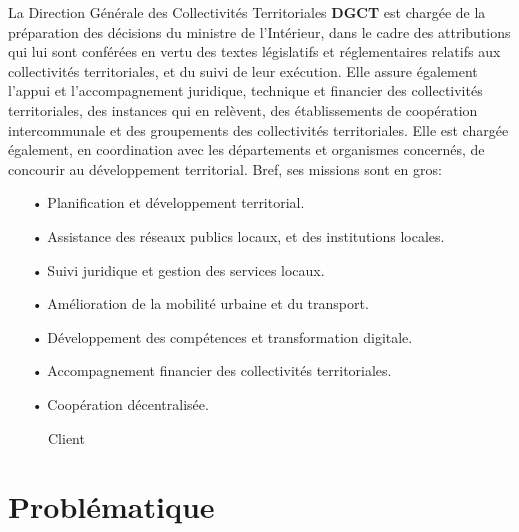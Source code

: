 \documentclass[a4paper]{report}
\begin{document}
\begin{doublespace}
	La Direction Générale des Collectivités Territoriales \textbf{DGCT} est
	chargée de la préparation des décisions du ministre de l’Intérieur,
	dans le cadre des attributions qui lui sont conférées en vertu des textes
	législatifs et réglementaires relatifs aux collectivités
	territoriales, et du suivi de leur exécution. Elle assure également l’appui
	et l'accompagnement juridique, technique et financier
	des collectivités territoriales, des instances qui en relèvent, des
	établissements de coopération intercommunale et des groupements
	des collectivités territoriales. Elle est chargée également, en
	coordination avec les départements et organismes concernés, de
	concourir au développement territorial. Bref, ses missions sont en gros:
	\begin{itemize}
		\item[•] Planification et développement territorial.
		\item[•] Assistance des réseaux publics locaux, et des institutions
		      locales.
		\item[•] Suivi juridique et gestion des services locaux.
		\item[•] Amélioration de la mobilité urbaine et du transport.
		\item[•] Développement des compétences et transformation digitale.
		\item[•] Accompagnement financier des collectivités territoriales.
		\item[•] Coopération décentralisée.
	\end{itemize}
	\begin{figure}[H]
		\begin{center}
			\caption{Client}
		\end{center}
	\end{figure}
	\newpage
	\section{Problématique}


\end{doublespace}
\end{document}
